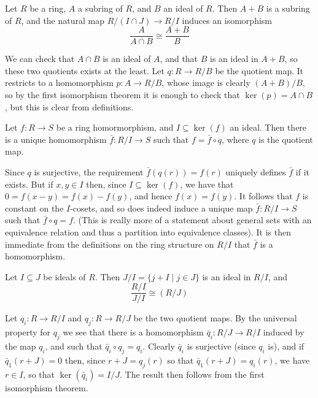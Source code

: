 \documentclass{maths}
\begin{document}
\begin{thm}
    Let $R$ be a ring, $A$ a subring of $R$, and $B$ an ideal of $R$.
    Then $A+B$ is a subring of $R$, and the natural map $R/(I\cap J)\to R/I$ induces an isomorphism
    \[
        \frac{A}{A\cap B} \cong
        \frac{A+B}{B}
    \]
\end{thm}

\begin{prf}
    We can check that $A\cap B$ is an ideal of $A$, and that $B$ is an ideal in $A+B$, so these two quotients exists at the least.
    Let $q\colon R\to R/B$ be the quotient map.
    It restricts to a homomorphism $p\colon A\to R/B$, whose image is clearly $(A+B)/B$, so by the first isomorphism theorem it is enough to check that $\ker(p)=A\cap B$, but this is clear from definitions.
\end{prf}

\begin{thm}
    Let $f\colon R\to S$ be a ring homormorphism, and $I\subseteq\ker(f)$ an ideal.
    Then there is a unique homomorphism $\bar{f}\colon R/I\to S$ such that $f=\bar{f}\circ q$, where $q$ is the quotient map.
\end{thm}

\begin{prf}
    Since $q$ is surjective, the requirement $\bar{f}(q(r))=f(r)$ uniquely defines $\bar{f}$ if it exists.
    But if $x,y\in I$ then, since $I\subseteq\ker(f)$, we have that $0=f(x-y)=f(x)-f(y)$, and hence $f(x)=f(y)$.
    It follows that $f$ is constant on the $I$-cosets, and so does indeed induce a unique map $\bar{f}:R/I\to S$ such that $\bar{f}\circ q=f$. (This is really more of a statement about general sets with an equivalence relation and thus a partition into equivalence classes).
    It is then immediate from the definitions on the ring structure on $R/I$ that $\bar{f}$ is a homomorphism.
\end{prf}

\begin{thm}
    Let $I\subseteq J$ be ideals of $R$.
    Then $J/I=\{j+I \mid j\in J\}$ is an ideal in $R/I$, and
    \[
        \frac{R/I}{J/I} \cong
        (R/J)
    \]
\end{thm}

\begin{prf}
    Let $q_i\colon R\to R/I$ and $q_j\colon R\to R/J$ be the two quotient maps.
    By the universal property for $q_j$ we see that there is a homomorphism $\bar{q}_i\colon R/J\to R/I$ induced by the map $q_i$, and such that $\bar{q}_i\circ q_j=q_i$.
    Clearly $\bar{q}_i$ is surjective (since $q_i$ is), and if $\bar{q}_1(r+J)=0$ then, since $r+J=q_j(r)$ so that $\bar{q}_1(r+J)=q_i(r)$, we have $r\in I$, so that $\ker(\bar{q}_i)=I/J$.
    The result then follows from the first isomorphism theorem.
\end{prf}
\end{document}
